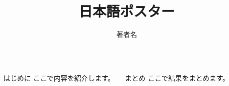\documentclass{beamer}
\title{日本語ポスター}
\author{著者名}
\begin{document}
\begin{frame}
\begin{columns}[t]
  \begin{block}{はじめに}
    ここで内容を紹介します。
  \end{block}
  \begin{block}{まとめ}
    ここで結果をまとめます。
  \end{block}
\end{columns}
\end{frame}
\end{document}
